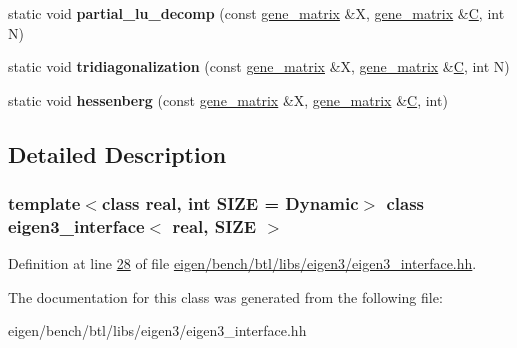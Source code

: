 \begin{DoxyCompactItemize}
static void {\bfseries partial\+\_\+lu\+\_\+decomp} (const \hyperlink{group___core___module_class_eigen_1_1_matrix}{gene\+\_\+matrix} \&X, \hyperlink{group___core___module_class_eigen_1_1_matrix}{gene\+\_\+matrix} \&\hyperlink{group___core___module}{C}, int N)
\item 
\mbox{\label{classeigen3__interface_a2690bb3d88fe13e22b5e252aab69bfe0}} 
static void {\bfseries tridiagonalization} (const \hyperlink{group___core___module_class_eigen_1_1_matrix}{gene\+\_\+matrix} \&X, \hyperlink{group___core___module_class_eigen_1_1_matrix}{gene\+\_\+matrix} \&\hyperlink{group___core___module}{C}, int N)
\item 
\mbox{\label{classeigen3__interface_a18b7b90f97d97df74d92bf8d084f839f}} 
static void {\bfseries hessenberg} (const \hyperlink{group___core___module_class_eigen_1_1_matrix}{gene\+\_\+matrix} \&X, \hyperlink{group___core___module_class_eigen_1_1_matrix}{gene\+\_\+matrix} \&\hyperlink{group___core___module}{C}, int)
\end{DoxyCompactItemize}


\subsection{Detailed Description}
\subsubsection*{template$<$class real, int S\+I\+ZE = Dynamic$>$\newline
class eigen3\+\_\+interface$<$ real, S\+I\+Z\+E $>$}



Definition at line \hyperlink{eigen_2bench_2btl_2libs_2eigen3_2eigen3__interface_8hh_source_l00028}{28} of file \hyperlink{eigen_2bench_2btl_2libs_2eigen3_2eigen3__interface_8hh_source}{eigen/bench/btl/libs/eigen3/eigen3\+\_\+interface.\+hh}.



The documentation for this class was generated from the following file\+:\begin{DoxyCompactItemize}
\item 
eigen/bench/btl/libs/eigen3/eigen3\+\_\+interface.\+hh\end{DoxyCompactItemize}
